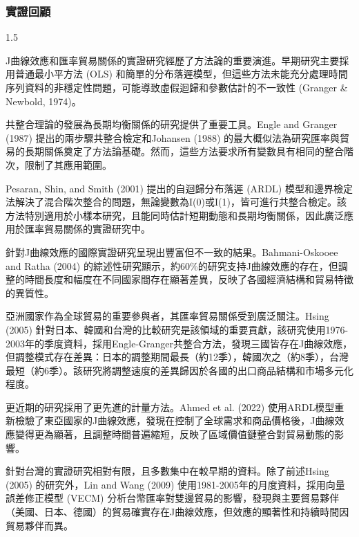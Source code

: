 \documentclass[a4paper,12pt]{article}
\begin{document}
\subsubsection{實證回顧}
\begin{spacing}{1.5}

J曲線效應和匯率貿易關係的實證研究經歷了方法論的重要演進。早期研究主要採用普通最小平方法 (OLS) 和簡單的分布落遲模型，但這些方法未能充分處理時間序列資料的非穩定性問題，可能導致虛假迴歸和參數估計的不一致性 (Granger \& Newbold, 1974)。

共整合理論的發展為長期均衡關係的研究提供了重要工具。Engle and Granger (1987) 提出的兩步驟共整合檢定和Johansen (1988) 的最大概似法為研究匯率與貿易的長期關係奠定了方法論基礎。然而，這些方法要求所有變數具有相同的整合階次，限制了其應用範圍。

Pesaran, Shin, and Smith (2001) 提出的自迴歸分布落遲 (ARDL) 模型和邊界檢定法解決了混合階次整合的問題，無論變數為I(0)或I(1)，皆可進行共整合檢定。該方法特別適用於小樣本研究，且能同時估計短期動態和長期均衡關係，因此廣泛應用於匯率貿易關係的實證研究中。

針對J曲線效應的國際實證研究呈現出豐富但不一致的結果。Bahmani-Oskooee and Ratha (2004) 的綜述性研究顯示，約60\%的研究支持J曲線效應的存在，但調整的時間長度和幅度在不同國家間存在顯著差異，反映了各國經濟結構和貿易特徵的異質性。

亞洲國家作為全球貿易的重要參與者，其匯率貿易關係受到廣泛關注。Hsing (2005) 針對日本、韓國和台灣的比較研究是該領域的重要貢獻，該研究使用1976-2003年的季度資料，採用Engle-Granger共整合方法，發現三國皆存在J曲線效應，但調整模式存在差異：日本的調整期間最長（約12季），韓國次之（約8季），台灣最短（約6季）。該研究將調整速度的差異歸因於各國的出口商品結構和市場多元化程度。

更近期的研究採用了更先進的計量方法。Ahmed et al. (2022) 使用ARDL模型重新檢驗了東亞國家的J曲線效應，發現在控制了全球需求和商品價格後，J曲線效應變得更為顯著，且調整時間普遍縮短，反映了區域價值鏈整合對貿易動態的影響。

針對台灣的實證研究相對有限，且多數集中在較早期的資料。除了前述Hsing (2005) 的研究外，Lin and Wang (2009) 使用1981-2005年的月度資料，採用向量誤差修正模型 (VECM) 分析台幣匯率對雙邊貿易的影響，發現與主要貿易夥伴（美國、日本、德國）的貿易確實存在J曲線效應，但效應的顯著性和持續時間因貿易夥伴而異。

\end{spacing}


\end{document}
